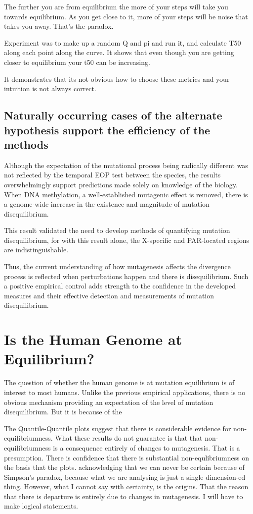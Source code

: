 The further you are from equilibrium the more of your steps will take you towards equilibrium.  As you get close to it, more of your steps will be noise that takes you away. That's the paradox. 

Experiment was to make up a random Q and pi and run it, and calculate T50 along each point along the curve. It shows that even though you are getting closer to equilibrium your t50 can be increasing. 

It demonstrates that its not obvious how to choose these metrics and your intuition is not always correct. 


\subsection*{Naturally occurring cases of the alternate hypothesis support the efficiency of the methods}


Although the expectation of the mutational process being radically different was not reflected by the temporal EOP test between the species, the results overwhelmingly support predictions made solely on knowledge of the biology. When DNA methylation, a well-established mutagenic effect is removed, there is a genome-wide increase in the existence and magnitude of mutation disequilibrium. 

This result validated the need to develop methods of quantifying mutation disequilibrium, for with this result alone, the X-specific and PAR-located regions are indistinguishable.

Thus, the current understanding of how mutagenesis affects the divergence process is reflected when perturbations happen and there is disequilibrium. Such a positive empirical control adds strength to the confidence in the developed measures and their effective detection and measurements of mutation disequilibrium. 

\section{Is the Human Genome at Equilibrium?}

The question of whether the human genome is at mutation equilibrium is of interest to most humans. Unlike the previous empirical applications, there is no obvious mechanism providing an expectation of the level of mutation disequilibrium. But it is because of the 


The Quantile-Quantile plots suggest that there is considerable evidence for non-equilibriumness. What these results do not guarantee is that that non-equilibriumness is a consequence entirely of changes to mutagenesis. That is a presumption. There is confidence that there is substantial non-equlibriumness on the basis that the plots. acknowledging that we can never be certain because of Simpson's paradox, because what we are analysing is just a single dimension-ed thing. However, what I cannot say with certainty, is the origins. That the reason that there is departure is entirely due to changes in mutagenesis. I will have to make logical statements. 


